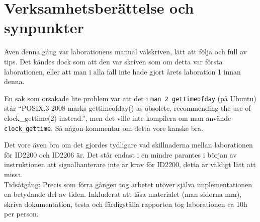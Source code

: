 \documentclass[a4paper]{article}
\begin{document}
\section*{Verksamhetsberättelse och synpunkter}
Även denna gång var laborationens manual välskriven, lätt att följa och full av tips. Det kändes dock som att den var skriven som om detta var första laborationen, eller att man i alla fall inte hade gjort årets laboration 1 innan denna.

En sak som orsakade lite problem var att det i \texttt{man 2 gettimeofday} (på Ubuntu) står ``POSIX.3-2008 marks gettimeofday() as obsolete, recommending the use of clock\_gettime(2) instead.'', men det ville inte kompilera om man använde \texttt{clock\_gettime}. Så någon kommentar om detta vore kanske bra.

Det vore även bra om det gjordes tydligare vad skillnaderna mellan laborationen för ID2200 och ID2206 är. Det står endast i en mindre parantes i början av instruktionen att signalhanterare inte är krav för ID2200, detta är väldigt lätt att missa.
\\
Tidsåtgång: Precis som förra gången tog arbetet utöver själva implementationen en betydande del av tiden. Inkluderat att läsa materialet (man sidorna mm), skriva dokumentation, testa och färdigställa rapporten tog laborationen ca 10h per person.
\end{document}

